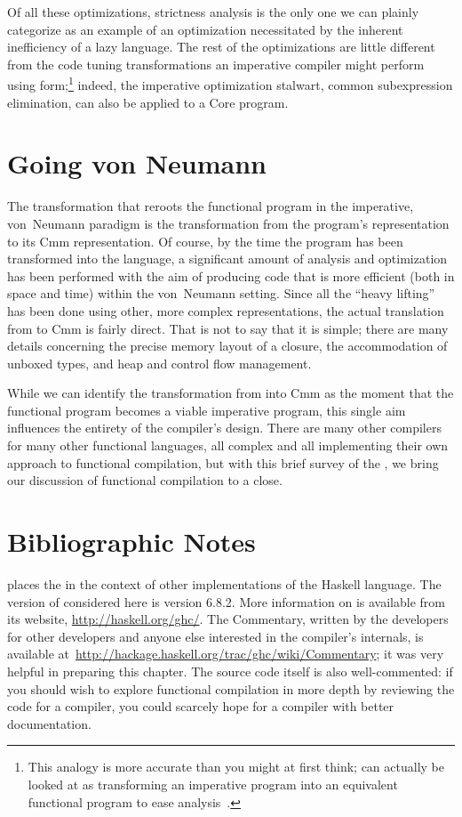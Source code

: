 Of all these optimizations, strictness analysis is the only one we can plainly categorize as an example of an optimization necessitated by the inherent inefficiency of a lazy language. The rest of the optimizations are little different from the code tuning transformations an imperative compiler might perform using \SSA[long] form;\footnote{This analogy is more accurate than you might at first think; \SSA can actually be looked at as transforming an imperative program into an equivalent functional program to ease analysis~\citep{Appel:SSA-is-functional:1998}.} indeed, the imperative optimization stalwart, common subexpression elimination, can also be applied to a Core program.

\section{Going von Neumann}
The transformation that reroots the functional program in the imperative, von~Neumann paradigm is the transformation from the program's  representation to its Cmm representation. Of course, by the time the program has been transformed into the  language, a significant amount of analysis and optimization has been performed with the aim of producing code that is more efficient (both in space and time) within the von~Neumann setting. Since all the ``heavy lifting'' has been done using other, more complex representations, the actual translation from  to Cmm is fairly direct. That is not to say that it is simple; there are many details concerning the precise memory layout of a closure, the accommodation of unboxed types, and heap and control flow management.

While we can identify the transformation from  into Cmm as the moment that the functional program becomes a viable imperative program, this single aim influences the entirety of the compiler's design. There are many other compilers for many other functional languages, all complex and all implementing their own approach to functional compilation, but with this brief survey of the \GHC[long], we bring our discussion of functional compilation to a close.

\section{Bibliographic Notes}
 places the \GHC[long] in the context of other implementations of the Haskell language. The version of \GHC considered here is version 6.8.2. More information on \GHC{} is available from its website, \url{http://haskell.org/ghc/}. The \GHC Commentary, written by the developers for other developers and anyone else interested in the compiler's internals, is available at~\url{http://hackage.haskell.org/trac/ghc/wiki/Commentary}; it was very helpful in preparing this chapter. The source code itself is also well-commented: if you should wish to explore functional compilation in more depth by reviewing the code for a compiler, you could scarcely hope for a compiler with better documentation.

